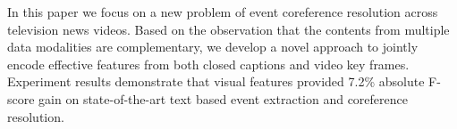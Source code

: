 In this paper we focus on a new problem of event coreference resolution across television news videos. Based on the observation that the contents from multiple data modalities are complementary, we develop a novel approach to jointly encode effective features from both closed captions and video key frames. Experiment results demonstrate that visual features provided 7.2\% absolute F-score gain on state-of-the-art text based event extraction and coreference resolution.
